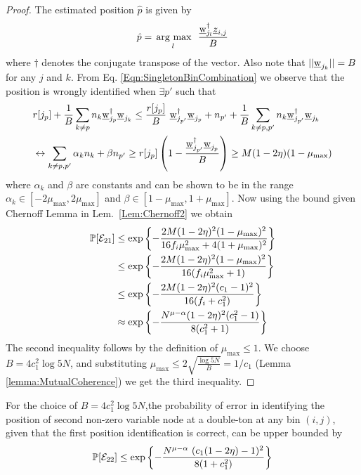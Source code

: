 \begin{proof}
	The estimated position $\hat{p}$ is given by
	\begin{align}
	\label{Eqn:SingletonBinCombination}
	\hat{p}= \underset{l}{\operatorname*{\,arg\ max}}~~ \frac{\underline{\mathrm{w}}_{j_l}^{\dagger}\underline{z}_{i,j}}{B}
	\end{align}
	where $\dagger$ denotes the conjugate transpose of the vector. Also note that $|| \underline{\mathrm{w}}_{j_k}||=B$ for any $j$ and $k$.  From Eq. \eqref{Eqn:SingletonBinCombination} we observe that the position is wrongly identified when $\exists p'$ such that
	\begin{align*}
	&r[j_p] + \frac{1}{B}\sum_{k \neq p} n_k 	\underline{\mathrm{w}}_{j_p}^{\dagger}\underline{\mathrm{w}}_{j_k} \leq \frac{r[j_p]}{B} ~ \underline{\mathrm{w}}_{j_{p'}}^{\dagger}\underline{\mathrm{w}}_{j_p}+ n_{p'}+\frac{1}{B}\sum_{k \neq p,p'}n_k\underline{\mathrm{w}}_{j_{p'}}^{\dagger} \underline{\mathrm{w}}_{j_k} \\
	&\leftrightarrow \sum_{k \neq p,p'}\alpha_k n_k+\beta n_{p'}\geq  r[j_p]\left(1-\frac{\underline{\mathrm{w}}_{j_{p'}}^{\dagger}\underline{\mathrm{w}}_{j_p}}{B}\right)\geq M(1-2\eta)(1-\mu_{\text{max}})
	\end{align*}
	where $\alpha_k$ and $\beta$ are constants and can be shown to be in the range $\alpha_k\in[-2\mu_\text{max},2\mu_\text{max}]$ and $\beta\in[1-\mu_\text{max},1+\mu_\text{max}]$. Now using the bound given Chernoff Lemma in Lem.~\ref{Lem:Chernoff2} we obtain
	\begin{align*}
	\mathbb{P}[\mathcal{E}_{21}]&\leq \exp\left\lbrace-\frac{2M(1-2\eta)^2(1-\mu_{\text{max}})^2}{16f_i\mu^2_{\max}+4(1+\mu_{\max})^2}\right\rbrace\\
	&\leq\exp\left\lbrace-\frac{2M(1-2\eta)^2(1-\mu_{\text{max}})^2}{16(f_i\mu^2_{\max}+1)}\right\rbrace\\
	&\leq\exp\left\lbrace-\frac{2M(1-2\eta)^2(c_1-1)^2}{16(f_i+c_1^2)}\right\rbrace\\
	&\approx\exp\left\lbrace-\frac{N^{\mu-\alpha}(1-2\eta)^2(c_1^2-1)}{8(c_1^2+1)}\right\rbrace\\
	\end{align*}
	The second inequality follows by the definition of  $\mu_{\text{max}} \leq 1$.  We choose $B=4c_1^2\log 5N$, and substituting $\mu_{\max}\leq 2\sqrt{\frac{\log 5N}{B}} = 1/c_1$ (Lemma \ref{lemma:MutualCoherence}) we get the third inequality.
	
\end{proof}
\begin{lemma}
	For the choice of $B=4c_1^2\log 5N$,the probability of error in identifying the position of second non-zero variable node at a double-ton at any bin $(i,j)$, given that the first position identification is correct, can be upper bounded by
	\begin{align*}
		\mathbb{P}[\mathcal{E}_{22}]\leq \exp\left\lbrace-\frac{N^{\mu - \alpha} ~ (c_1(1 - 2\eta) - 1)^2}{8(1+ c_1^2)}\right\rbrace
	\end{align*}
\end{lemma}
